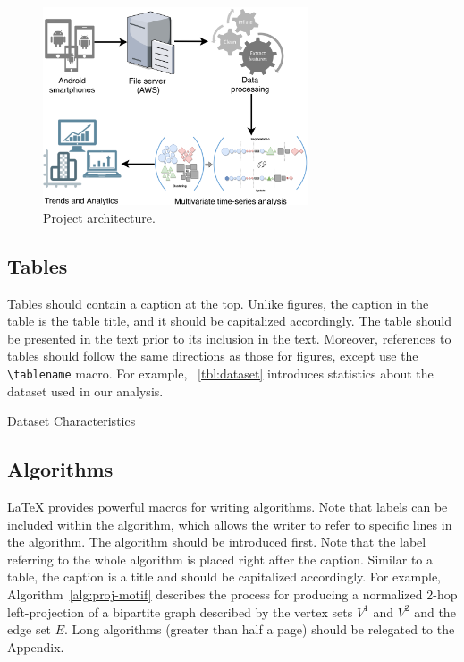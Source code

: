 \begin{figure}[!htb]
  \centering
  \includegraphics[width=0.7\textwidth]{img/proj-arch.pdf}
  \caption{Project architecture.}
  \label{fig:proj-arch}
\end{figure}


\subsection{Tables}\label{sec:latex:tables}

Tables should contain a caption at the top. Unlike figures, the caption in the table is the table title, and it should be capitalized accordingly. The table should be presented in the text prior to its inclusion in the text. Moreover, references to tables should follow the same directions as those for figures, except use the \texttt{{\textbackslash}tablename} macro. For example, \tablename~\ref{tbl:dataset} introduces statistics about the dataset used in our analysis.

\begin{table}[!htb]
\caption{Dataset Characteristics}
\label{tbl:dataset}
\centering

\end{table}

\subsection{Algorithms}\label{sec:latex:algorithms}

LaTeX provides powerful macros for writing algorithms. Note that labels can be included within the algorithm, which allows the writer to refer to specific lines in the algorithm. The algorithm should be introduced first. Note that the label referring to the whole algorithm is placed right after the caption. Similar to a table, the caption is a title and should be capitalized accordingly. For example, Algorithm~\ref{alg:proj-motif} describes the process for producing a normalized 2-hop left-projection of a bipartite graph described by the vertex sets $V^1$ and $V^2$ and the edge set $E$. Long algorithms (greater than half a page) should be relegated to the Appendix.


